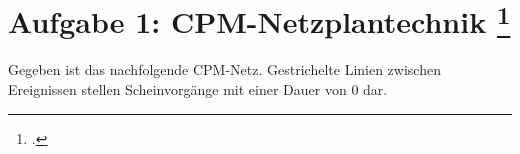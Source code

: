 \documentclass{lehramt-informatik-aufgabe}
\begin{document}
\let\f=\footnotesize
\let\FZ=\liCpmFruehesterI
\let\SZ=\liCpmSpaetesterI
\let\v=\liCpmVon
\let\vz=\liCpmVonZu
\let\z=\liCpmZu

\section{Aufgabe 1: CPM-Netzplantechnik
\footcite[Seite 1]{sosy:ab:5}
}

Gegeben ist das nachfolgende CPM-Netz. Gestrichelte Linien zwischen
Ereignissen stellen Scheinvorgänge mit einer Dauer von $0$ dar.

\begin{center}
\end{center}
\end{document}
